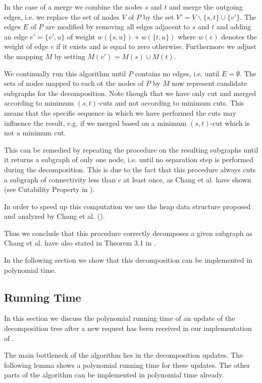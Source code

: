 \documentclass[a4paper, 10pt]{article}
\newcommand{\adjDel}{\text{C{\scriptsize REP}-A{\scriptsize DJ}}}
\theoremstyle{definition}
\begin{document}
In the case of a merge we combine the nodes $s$ and $t$ and merge the outgoing edges, i.e. we replace the set of nodes $V$ of $P$ by the set $V'=V\backslash\{s,t\}\cup\{v'\}$. The edges $E$ of $P$ are modified by removing all edges adjacent to $s$ and $t$ and adding an edge $e'=\{v',u\}$ of weight $w(\{s,u\})+w(\{t,u\})$ where $w(e)$ denotes the weight of edge $e$ if it exists and is equal to zero otherwise.
Furthermore we adjust the mapping $M$ by setting $M(v')=M(s)\cup M(t)$.

We continually run this algorithm until $P$ contains no edges, i.e. until $E=\emptyset$. The sets of nodes mapped to each ot the nodes of $P$ by $M$ now represent candidate subgraphs for the decomposition. Note though that we have only cut and merged according to minimum $(s,t)$-cuts and not according to minimum cuts. This means that the specific sequence in which we have performed the cuts may influence the result, e.g. if we merged based on a minimum $(s,t)$-cut which is not a minimum cut.

This can be remedied by repeating the procedure on the resulting subgraphs until it returns a subgraph of only one node, i.e. until no separation step is performed during the decomposition. This is due to the fact that this procedure always cuts a subgraph of connectivity less than $c$ at least once, as Chang et al. have shown (see Cutability Property in \cite{Chang2013}).

In order to speed up this computation we use the heap data structure proposed and analyzed by Chang et al. (\cite{Chang2013}).

Thus we conclude that this procedure correctly decomposes a given subgraph as Chang et al. have also stated in Theorem 3.1 in \cite{Chang2013}.

In the following section we show that this decomposition can be implemented in polynomial time.


\subsection{Running Time}
\label{run_time_sec}
In this section we discuss the polynomial running time of an update of the decomposition tree after a new request has been received in our implementation of \adjDel{}.

The main bottleneck of the algorithm lies in the decomposition updates. The following lemma shows a polynomial running time for these updates.
The other parts of the algorithm can be implemented in polynomial time already.
\end{document}
